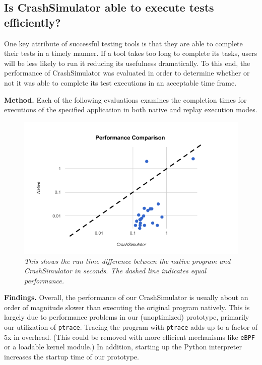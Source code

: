 \subsection{Is CrashSimulator able to execute tests efficiently?}
\label{sec-perf}


One key attribute of successful testing tools is that they are able to
complete their tests in a timely manner.  If a tool takes too long to
complete its tasks, users will be less likely to run it reducing its
usefulness dramatically. To this end, the performance of CrashSimulator was
evaluated in order to determine whether or not it was able to complete its
test executions in an acceptable time frame.

{\bf Method.} Each of the following evaluations examines the completion
times for executions of the specified application in both
native and replay execution modes.


    \begin{figure}[t]
        \center{}
        \includegraphics[scale=.5]{performance.png}
        \caption{\emph{This shows the run time difference between the
native program and CrashSimulator in seconds. The dashed line indicates equal
performance. }}
         \label{figure:performance}

    \end{figure}


{\bf Findings.} Overall, the performance of our CrashSimulator is usually
about an order of magnitude slower than executing the original program
natively.  This is largely due to performance problems in our (unoptimized)
prototype, primarily our utilization of {\tt ptrace}.  Tracing the program
with {\tt ptrace} adds up to a factor of 5x in overhead.  (This could be
removed with more efficient mechanisms like {\tt eBPF} or a loadable kernel
module.)  In addition, starting up the Python interpreter increases the
startup time of our prototype.

